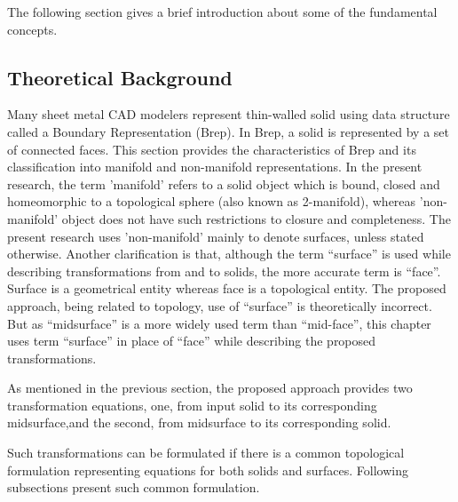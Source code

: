 The following section gives a brief introduction about some of the fundamental concepts.

\subsection{Theoretical Background}\label{sec:topoval:preliminaries}

Many sheet metal CAD modelers represent thin-walled solid using data structure called a Boundary Representation (Brep). In Brep, a solid is represented by a set of connected faces. This section provides the characteristics of Brep and its classification into manifold and non-manifold representations. In the present research, the term 'manifold' refers to a solid object which is bound, closed and homeomorphic to a topological sphere (also known as 2-manifold), whereas 'non-manifold' object does not have such restrictions to closure and completeness. The present research uses 'non-manifold' mainly to denote surfaces, unless stated otherwise. Another clarification is that, although the term ``surface'' is used while describing transformations from and to solids, the more accurate term is ``face''. Surface is a geometrical entity whereas face is a topological entity. The proposed approach, being related to topology, use of ``surface'' is theoretically incorrect. But as ``midsurface'' is a more widely used term than ``mid-face'', this chapter uses term ``surface'' in place of ``face'' while describing the proposed transformations.

As mentioned in the previous section, the proposed approach provides two transformation equations, one, from input solid to its corresponding midsurface,and the second, from midsurface to its corresponding solid.

Such transformations can be formulated if there is a common topological formulation representing equations for both solids and surfaces. Following subsections present such common formulation.

